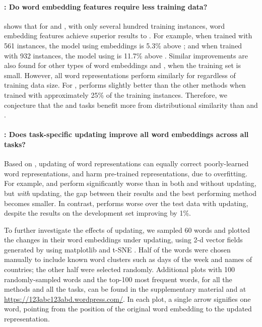 \paragraph{\RQ[2]: Do word embedding features require less training data?}
 shows that for \pos and \ner, with only several hundred training instances, 
word embedding features achieve superior results to \unigram. 
For example, when trained with 561 instances, the \pos model using \Skipgram[\withup] embeddings is 5.3\% above
\unigram; and when trained with 932 instances, the \ner model using \Skipgram is 11.7\% above \unigram. 
Similar improvements are also found for other types of word embeddings and \brown, when the training set is small. 
However, all word representations perform similarly for \chunking
regardless of training data size.
For \mwe, \brown performs slightly better than the other methods when
trained with approximately 25\% of the training instances. 
Therefore, we conjecture that the \pos and \ner tasks benefit more from
distributional similarity than \chunking and \mwe.

\paragraph{\RQ[3]: Does task-specific updating improve all word embeddings across all tasks?}
Based on , updating of word representations can
equally correct poorly-learned word representations, and harm
pre-trained representations, due to overfitting.
For example, \CW and \Glove perform significantly worse than \Skipgram
in both \pos and \ner without updating, but \emph{with} updating, the
gap between their results and the best performing method becomes
smaller. In contrast, \Skipgram performs worse over the test data with
updating, despite the results on the development set improving by 1\%.

To further investigate the effects of updating, we sampled 60 words and
plotted the changes in their word embeddings under updating, using 2-d
vector fields generated by using matplotlib and t-SNE \cite{vanderMaaten:Hinton:2008}. Half
of the words were chosen manually to include known word clusters such as
days of the week and names of countries; the other half were selected
randomly. Additional plots with 100 randomly-sampled words and the
top-100 most frequent words, for all the methods and all the tasks, can
be found in the supplementary material and at
\url{https://123abc123abd.wordpress.com/}.  In each plot, a single arrow
signifies one word, pointing from the position of the original word embedding to the updated representation.

